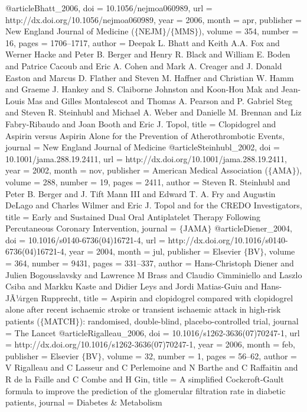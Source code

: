 @article{Bhatt_2006,
	doi = {10.1056/nejmoa060989},
	url = {http://dx.doi.org/10.1056/nejmoa060989},
	year = 2006,
	month = {apr},
	publisher = {New England Journal of Medicine ($\lbrace$NEJM$\rbrace$/$\lbrace$MMS$\rbrace$)},
	volume = {354},
	number = {16},
	pages = {1706--1717},
	author = {Deepak L. Bhatt and Keith A.A. Fox and Werner Hacke and Peter B. Berger and Henry R. Black and William E. Boden and Patrice Cacoub and Eric A. Cohen and Mark A. Creager and J. Donald Easton and Marcus D. Flather and Steven M. Haffner and Christian W. Hamm and Graeme J. Hankey and S. Claiborne Johnston and Koon-Hou Mak and Jean-Louis Mas and Gilles Montalescot and Thomas A. Pearson and P. Gabriel Steg and Steven R. Steinhubl and Michael A. Weber and Danielle M. Brennan and Liz Fabry-Ribaudo and Joan Booth and Eric J. Topol},
	title = {Clopidogrel and Aspirin versus Aspirin Alone for the Prevention of Atherothrombotic Events},
	journal = {New England Journal of Medicine}
}
@article{Steinhubl_2002,
	doi = {10.1001/jama.288.19.2411},
	url = {http://dx.doi.org/10.1001/jama.288.19.2411},
	year = 2002,
	month = {nov},
	publisher = {American Medical Association ($\lbrace$AMA$\rbrace$)},
	volume = {288},
	number = {19},
	pages = {2411},
	author = {Steven R. Steinhubl and Peter B. Berger and J. Tift Mann III and Edward T. A. Fry and Augustin DeLago and Charles Wilmer and Eric J. Topol and  for the CREDO Investigators},
	title = {Early and Sustained Dual Oral Antiplatelet Therapy Following Percutaneous Coronary Intervention},
	journal = {$\lbrace$JAMA$\rbrace$}
}
@article{Diener_2004,
	doi = {10.1016/s0140-6736(04)16721-4},
	url = {http://dx.doi.org/10.1016/s0140-6736(04)16721-4},
	year = 2004,
	month = {jul},
	publisher = {Elsevier $\lbrace$BV$\rbrace$},
	volume = {364},
	number = {9431},
	pages = {331--337},
	author = {Hans-Christoph Diener and Julien Bogousslavsky and Lawrence M Brass and Claudio Cimminiello and Laszlo Csiba and Markku Kaste and Didier Leys and Jordi Matias-Guiu and Hans-JÃ¼rgen Rupprecht},
	title = {Aspirin and clopidogrel compared with clopidogrel alone after recent ischaemic stroke or transient ischaemic attack in high-risk patients ($\lbrace$MATCH$\rbrace$): randomised, double-blind, placebo-controlled trial},
	journal = {The Lancet}
}
@article{Rigalleau_2006,
	doi = {10.1016/s1262-3636(07)70247-1},
	url = {http://dx.doi.org/10.1016/s1262-3636(07)70247-1},
	year = 2006,
	month = {feb},
	publisher = {Elsevier $\lbrace$BV$\rbrace$},
	volume = {32},
	number = {1},
	pages = {56--62},
	author = {V Rigalleau and C Lasseur and C Perlemoine and N Barthe and C Raffaitin and R de la Faille and C Combe and H Gin},
	title = {A simplified Cockcroft-Gault formula to improve the prediction of the glomerular filtration rate in diabetic patients},
	journal = {Diabetes {\&} Metabolism}
}
